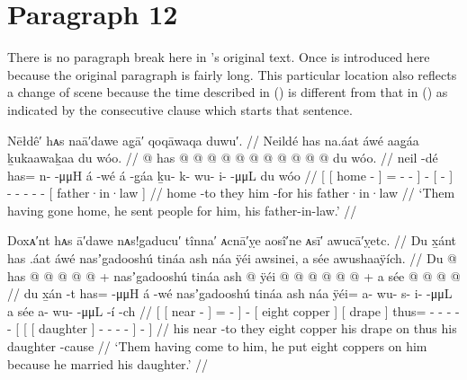 \section{Paragraph 12}\label{sec:89-para-12}

There is no paragraph break here in \citeauthor{swanton:1909}’s original text.
Once is introduced here because the original paragraph is fairly long.
This particular location also reflects a change of scene because the time described in (\lastx) is different from that in (\nextx) as indicated by the consecutive clause which starts that sentence.

\ex\label{ex:89-195-send-for-father-in-law}%
%
\begingl
	\glpreamble	Nēłdê′ hᴀs naā′dawe ag̣ā′ qoqāwaqa duwu′. //
	\glpreamble	Neildé has na.áat áwé aag̱áa ḵukaawaḵaa du wóo. //
	\gla	{} {}  @ {} {}
			has @  @ {} @ {} @ {} {}
		 @ {}
		{}  @ {} {}
		 @ {} @ {} @ {} @ {} @ {}
		{} du wóo. {} //
	\glb	{} {} neil -dé {}
			has= n-  -μμH {} {}
		á -wé
		{} á -g̱áa {}
		ḵu- k- wu- i-  -μμL
		{} du wóo {} //
	\glc	{}[ {}[ home - {}]
			= -  - \· {}]
		 -
		{}[  - {}]
		- - - -  -
		{}[  father·in·law {}] //
	\gld	{} {} home -to {}
			they  {} {} {} {}
		 {}
		{} him -for {}
		 {} {} {} {} {}
		{} his father·in·law {} //
	\glft	‘Them having gone home, he sent people for him, his father-in-law.’
		//
\endgl
\xe

\ex\label{ex:89-196-paid-eight-coppers}%
%
\begingl
	\glpreamble	Doxᴀ′nt hᴀs ā′dawe nᴀs!gaducu′ tînna′ ᴀcnā′ỵe aosî′ne ᴀsī′ awucā′ỵetc. //
	\glpreamble	Du x̱ánt has .áat áwé nasʼgadooshú tináa ash náa ÿéi awsinei, a sée awushaaÿích. //
	\gla	{} {} Du  @ {} {}
			has @  @ {} @ {} @ {} {}
		 @ {} +
		{} nasʼgadooshú tináa {}
		{} ash  @ {} {}
		ÿéi @  @ {} @ {} @ {} @ {} @ {} +
		{} {} {} a sée {}
			 @ {} @ {} @ {} @ {} {} {} {} //
	\glb	{} {} du x̱án -t {}
			has= {}  -μμH {} {}
		á -wé
		{} nasʼgadooshú tináa {}
		{} ash náa {} {}
		ÿéi= a- wu- s- i-  -μμL
		{} {} {} a sée {}
			a- wu-  -μμL -í {} -ch {}  //
	\glc	{}[ {}[  near - {}]
			= \·  - \· {}]
		 -
		{}[ eight copper {}]
		{}[  drape \· {}]
		thus= - - - -  -
		{}[ {}[ {}[  daughter {}]
			- -  - - {}] - {}] //
	\gld	{} {} his near -to {}
			they  {} {} {} {}
		 {}
		{} eight copper {}
		{} his drape \·on {}
		thus  {} {} {} {} {}
		{} {} {} his daughter {}
			 {} {} {} {} {} -cause {} //
	\glft	‘Them having come to him, he put eight coppers on him because he married his daughter.’
		//
\endgl
\xe

